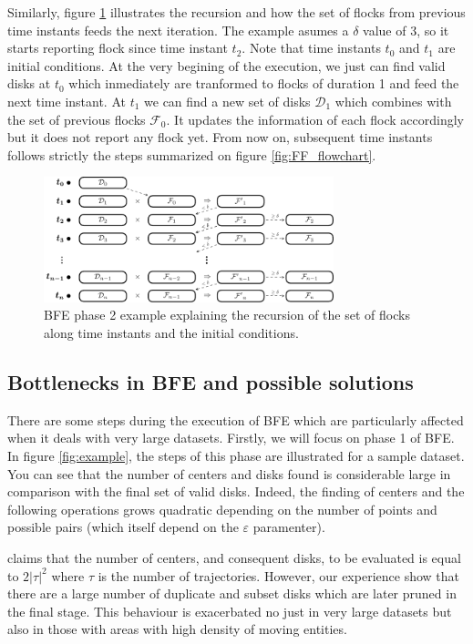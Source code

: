 Similarly, figure \ref{fig:FF_stages} illustrates the recursion and how the set of flocks from previous time instants feeds the next iteration.  The example asumes a $\delta$ value of 3, so it starts reporting flock since time instant $t_2$.  Note that time instants $t_0$ and $t_1$ are initial conditions.  At the very begining of the execution, we just can find valid disks at $t_0$ which inmediately are tranformed to flocks of duration 1 and feed the next time instant.  At $t_1$ we can find a new set of disks $\mathcal{D}_1$ which combines with the set of previous flocks $\mathcal{F}_0$.  It updates the information of each flock accordingly but it does not report any flock yet.  From now on, subsequent time instants follows strictly the steps summarized on figure \ref{fig:FF_flowchart}.

\begin{figure}[!ht]
    \centering
    \includegraphics[width=0.75\textwidth]{figures/FF_stages}
    \caption{BFE phase 2 example explaining the recursion of the set of flocks along time instants and the initial conditions.}\label{fig:FF_stages}
\end{figure}

\subsection{Bottlenecks in BFE and possible solutions}
There are some steps during the execution of BFE which are particularly affected when it deals with very large datasets.  Firstly, we will focus on phase 1 of BFE.  In figure \ref{fig:example}, the steps of this phase are illustrated for a sample dataset.  You can see that the number of centers and disks found is considerable large in comparison with the final set of valid disks.  Indeed, the finding of centers and the following operations grows quadratic depending on the number of points and possible pairs (which itself depend on the $\varepsilon$ paramenter).   

\cite{vieira_2009} claims that the number of centers, and consequent disks, to be evaluated is equal to $2\lvert\tau\rvert^2$ where $\tau$ is the number of trajectories.  However, our experience show that there are a large number of duplicate and subset disks which are later pruned in the final stage.  This behaviour is exacerbated no just in very large datasets but also in those with areas with high density of moving entities.

